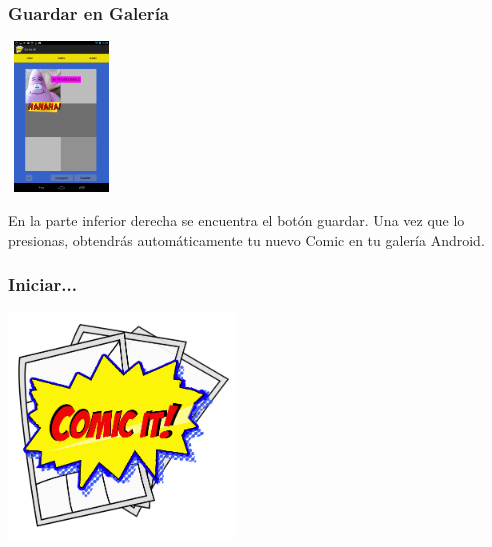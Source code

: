 \documentclass[utf8]{beamer}
\begin{document}
\begin{frame}
  \frametitle{Guardar en Galería}
 

  	\begin{center}
		\begingroup
			\includegraphics[height=4cm,width=2.8205cm]{imagenes/drag.png}
		\endgroup
	\end{center}

  \begin{block}{}
En la parte inferior derecha se encuentra el botón guardar. Una vez que lo presionas, obtendrás automáticamente tu nuevo Comic en tu galería Android.
  \end{block}

\end{frame}

\begin{frame}
  \frametitle{Iniciar...}

  	\begin{center}
		\begingroup
			\includegraphics[height=6cm,width=6cm]{imagenes/comicit.jpg}
		\endgroup
	\end{center}
\end{frame}
\end{document}
